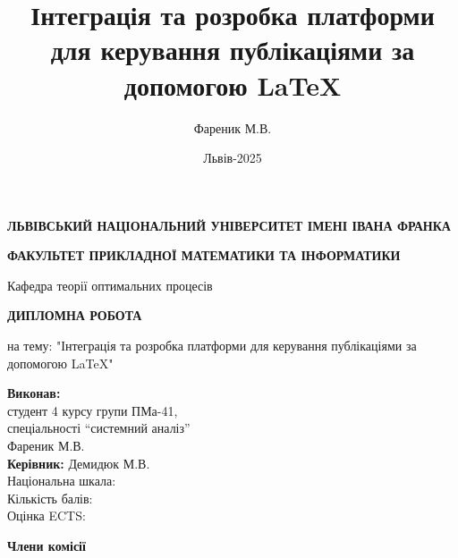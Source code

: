 \documentclass[a4paper,14pt]{extarticle}
\title{Інтеграція та розробка платформи для керування публікаціями за допомогою LaTeX}
\author{Фареник М.В.}
\date{Львів-2025}
\numberwithin{figure}{section}
\begin{document}
    
    \begin{titlepage}
        \begin{center}
        
        \footnotesize\textbf{ ЛЬВІВСЬКИЙ НАЦІОНАЛЬНИЙ УНІВЕРСИТЕТ ІМЕНІ ІВАНА ФРАНКА}
        
        \vspace{0.5cm}
        \textbf{ ФАКУЛЬТЕТ ПРИКЛАДНОЇ МАТЕМАТИКИ ТА ІНФОРМАТИКИ}
        
        \vspace{0.5cm}
        
        \hspace*{8cm}
        \small{Кафедра теорії оптимальних процесів}
        
        \vspace{3cm}
        \begin{spacing}{1} 
            \textbf{\Large ДИПЛОМНА РОБОТА}
            
            \large на тему:  "Інтеграція та розробка платформи для керування публікаціями за допомогою LaTeX"
        \end{spacing}
        
        \vspace{2cm}
        \hspace*{8cm}
        \begin{minipage}{0.7\textwidth} 
            \begin{flushleft}
                \normalsize\textbf{Виконав:} \\
                студент 4 курсу групи ПМа-41, \\
                спеціальності ``системний аналіз'' \\
                Фареник М.В. \\
                \textbf{Керівник:} Демидюк М.В. \\
                Національна шкала: \underline{\hspace{2cm}} \\
                Кількість балів: \underline{\hspace{1cm}} \\
                Оцінка ECTS: \underline{\hspace{1cm}}
            \end{flushleft}
        \end{minipage}
        
        
        \vspace{0.5cm}
        \begin{spacing}{1}
            \normalsize\textbf{Члени комісії}
            

\end{spacing}
\end{center}
\end{titlepage}
\end{document}
